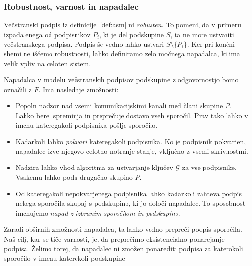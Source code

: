 \subsubsection{Robustnost, varnost in napadalec}
Večstranski podpis iz definicije~\ref{def:asm} ni \textit{robusten}. To pomeni, da v primeru izpada
enega od podpisnikov $P_i$, ki je del podskupine $S$, ta ne more ustvariti večstranskega podpisa.
Podpis še vedno lahko ustvari $S \setminus \{P_i\}$. Ker pri končni shemi ne iščemo robustnosti,
lahko definiramo zelo močnega napadalca, ki ima velik vpliv na celoten sistem.
\begin{definicija}
\label{def:asm-napadalec}
    Napadalca v modelu večstranskih podpisov podskupine z odgovornostjo bomo označili z $F$. Ima
    naslednje zmožnosti:
    \begin{itemize}
        \item Popoln nadzor nad vsemi komunikacijskimi kanali med člani skupine $P$. Lahko bere,
            spreminja in preprečuje dostavo vseh sporočil. Prav tako lahko v imenu kateregakoli
            podpisnika pošlje sporočilo.
        \item Kadarkoli lahko \textit{pokvari} kateregakoli podpisnika. Ko je podpisnik pokvarjen,
            napadalec izve njegovo celotno notranje stanje, vključno z vsemi skrivnostmi.
        \item Nadzira lahko vhod algoritma za ustvarjanje ključev $\mathcal{G}$ za vse podpisnike.
            Vsakemu lahko poda drugačno skupino $P$.
        \item Od kateregakoli nepokvarjenega podpisnika lahko kadarkoli zahteva podpis nekega sporočila
            skupaj s podskupino, ki jo določi napadalec. To sposobnost imenujemo
            \textit{napad z izbranim sporočilom in podskupino}.
    \end{itemize}
\end{definicija}

Zaradi obširnih zmožnosti napadalca, ta lahko vedno prepreči podpis sporočila. Naš cilj, kar se
tiče varnosti, je, da preprečimo eksistencialno ponarejanje podpisa. Želimo torej, da napadalec ni
zmožen ponarediti podpisa za katerokoli sporočilo v imenu katerekoli podskupine.

